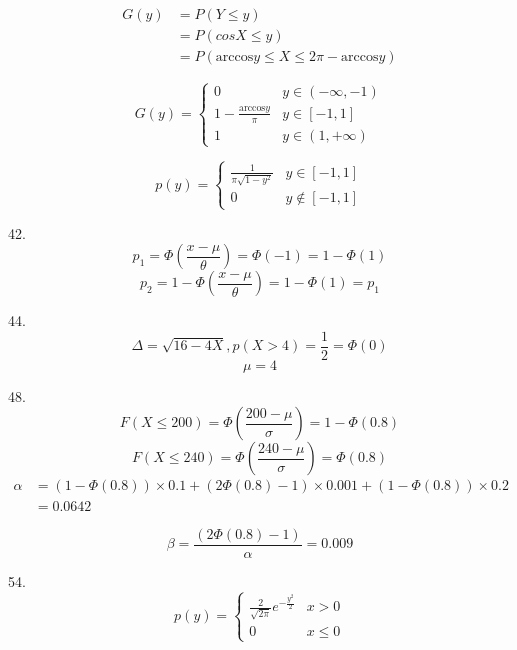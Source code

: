 \documentclass[10pt, a4paper,twocolumn]{article}
\begin{document}
    $$
        \begin{aligned}
            G(y) &= P(Y \leqslant y) \\
                &= P(cosX \leqslant y) \\ 
                &= P(\text{arccos}y \leqslant X \leqslant 2\pi - \text{arccos}y)
        \end{aligned}
    $$

    $$
        G(y) = 
        \begin{cases}
            0 & y \in (-\infty, -1) \\
            1 - \frac{\text{arccos}y}{\pi} & y \in [-1, 1] \\ 
            1 & y \in (1, +\infty)
        \end{cases}
    $$

    $$
        p(y) = 
        \begin{cases}
            \frac{1}{\pi\sqrt{1 - y^2}} & y \in [-1, 1] \\
            0 & y \notin [-1, 1]
        \end{cases}
    $$

42. 
$$p_1 = \Phi(\frac{x - \mu}{\theta}) = \Phi(-1) = 1 - \Phi(1)$$
$$p_2 = 1 - \Phi(\frac{x - \mu}{\theta}) = 1 - \Phi(1) = p_1 $$

44.
$$\Delta = \sqrt{16 - 4X}, p(X > 4) = \frac{1}{2} = \Phi(0)$$
$$\mu = 4$$

48.
$$F(X \leqslant 200) = \Phi(\frac{200 - \mu}{\sigma}) = 1 -\Phi(0.8)$$
$$F(X \leqslant 240) = \Phi(\frac{240 - \mu}{\sigma}) = \Phi(0.8)$$
$$\begin{aligned}
    \alpha &= (1 - \Phi(0.8)) \times 0.1 + (2\Phi(0.8) - 1) \times 0.001 + (1 - \Phi(0.8)) \times 0.2 \\
    &= 0.0642
\end{aligned}
        $$

$$\beta = \frac{(2\Phi(0.8) - 1)}{\alpha} = 0.009$$

54.
$$p(y) = \begin{cases}
    \frac{2}{\sqrt{2\pi}}e^{-\frac{y^2}{2}} & x > 0 \\
    0 & x \leqslant 0
\end{cases}$$
\end{document}
